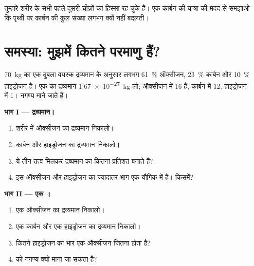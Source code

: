 \begin{exercise}[$\star\star\star$]\label{exo:g9:elements-universe-earth:12}
तुम्हारे शरीर के सभी  पहले दूसरी चीज़ों का हिस्सा रह चुके हैं। एक कार्बन
 की यात्रा की मदद से समझाओ कि पृथ्वी पर कार्बन  की कुल संख्या
लगभग क्यों नहीं बदलती।
\end{exercise}

\section{समस्या: मुझमें कितने परमाणु हैं?}

\begin{problem}
\label{pb:g9:elements-universe-earth:1}
\qty{70}{kg} का एक दुबला वयस्क द्रव्यमान के अनुसार लगभग \qty{61}{\percent}
ऑक्सीजन, \qty{23}{\percent} कार्बन और \qty{10}{\percent} हाइड्रोजन है।
एक  का द्रव्यमान \qty{1.67e-27}{kg} लो; ऑक्सीजन  में 16
 हैं, कार्बन  में 12, हाइड्रोजन  में 1।  नगण्य माने जाते हैं।

\medskip
\noindent\textbf{भाग I --- द्रव्यमान।}
\begin{enumerate}
  \item शरीर में ऑक्सीजन का द्रव्यमान निकालो।
  \item कार्बन और हाइड्रोजन का द्रव्यमान निकालो।
  \item ये तीन तत्व मिलकर द्रव्यमान का कितना प्रतिशत बनाते
        हैं?
  \item इस ऑक्सीजन और हाइड्रोजन का ज़्यादातर भाग एक यौगिक में है। किसमें?
\end{enumerate}

\medskip
\noindent\textbf{भाग II --- एक ।}
\begin{enumerate}[resume]
  \item एक ऑक्सीजन  का द्रव्यमान निकालो।
  \item एक कार्बन  और एक हाइड्रोजन  का द्रव्यमान निकालो।
  \item कितने हाइड्रोजन  का भार एक ऑक्सीजन  जितना होता है?
  \item {} को नगण्य क्यों माना जा सकता है?
\end{enumerate}


\end{problem}
